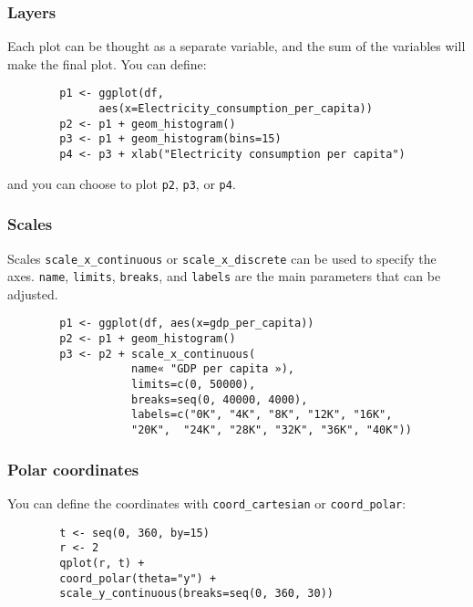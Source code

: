 \documentclass{beamer}
\begin{document}
	\begin{frame}[fragile]
		\frametitle{Layers}

		Each plot can be thought as a separate variable, and the sum of the variables will make the final plot. You can define:

		\vspace{2em}

		\begin{exampleblock}{}
		\begin{BVerbatim}
		p1 <- ggplot(df,
		      aes(x=Electricity_consumption_per_capita))
		p2 <- p1 + geom_histogram()
		p3 <- p1 + geom_histogram(bins=15)
		p4 <- p3 + xlab("Electricity consumption per capita")
		\end{BVerbatim}
		\end{exampleblock}{}

		\vspace{2em}

		and you can choose to plot \verb|p2|, \verb|p3|, or \verb|p4|.

	\end{frame}

	\begin{frame}[fragile]
		\frametitle{Scales}

		Scales \verb|scale_x_continuous| or \verb|scale_x_discrete| can be used to specify the axes. \verb|name|, \verb|limits|, \verb|breaks|, and \verb|labels| are the main parameters that can be adjusted.

		\vspace{2em}

		\begin{exampleblock}{}
		\begin{BVerbatim}
		p1 <- ggplot(df, aes(x=gdp_per_capita))
		p2 <- p1 + geom_histogram()
		p3 <- p2 + scale_x_continuous(
		           name« "GDP per capita »),
		           limits=c(0, 50000),
		           breaks=seq(0, 40000, 4000),
		           labels=c("0K", "4K", "8K", "12K", "16K",
		           "20K",  "24K", "28K", "32K", "36K", "40K"))
		\end{BVerbatim}
		\end{exampleblock}{}

	\end{frame}

	\begin{frame}[fragile]
		\frametitle{Polar coordinates}

		You can define the coordinates with \verb|coord_cartesian| or \verb|coord_polar|:

		\vspace{2em}

		\begin{exampleblock}{}
		\begin{BVerbatim}
		t <- seq(0, 360, by=15)
		r <- 2
		qplot(r, t) +
		coord_polar(theta="y") +
		scale_y_continuous(breaks=seq(0, 360, 30))
		\end{BVerbatim}
		\end{exampleblock}{}

	\end{frame}
\end{document}
